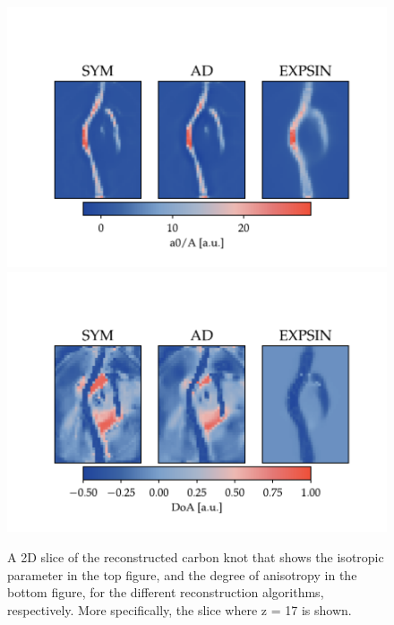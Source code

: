 \begin{figure}[h!]
    \centering

    \includegraphics[trim = {0 0 0 2.0cm}, clip, width = 1\textwidth]{./svg-inkscape/ck_slices_A_svg-tex.pdf}
    \includegraphics[trim = {0 0 0 2.0cm}, clip, width = 1\textwidth]{./svg-inkscape/ck_slices_DoA_svg-tex.pdf}

    \caption[Slice of Reconstructed Coefficients for Carbon Knot]{  A 2D slice of the reconstructed carbon knot that shows the isotropic parameter in the top figure, and the degree of anisotropy in the bottom figure, for the different reconstruction algorithms, respectively.
        More specifically, the slice where z = 17 is shown. }
    \label{fig:carbon_knot_reconstruction_2D_coeffs}
\end{figure}

